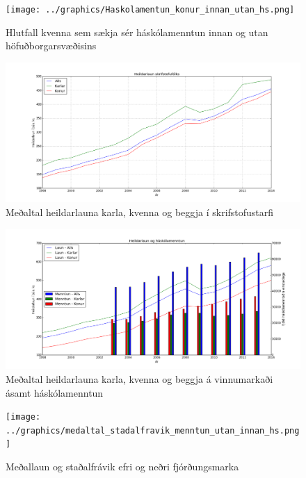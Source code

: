 \documentclass[12pt, git, draft]{rureport}
\begin{document}
\begin{figure}
	\centering 
	\texttt{[image: ../graphics/Haskolamentun\_konur\_innan\_utan\_hs.png]}
	\caption{Hlutfall kvenna sem sækja sér háskólamenntun innan og utan höfuðborgarsvæðisins\label{fig:menntunkonur}}
\end{figure}

\begin{figure}
	\centering 
	\includegraphics[width=\textwidth]{graphics/heildar_laun.png}
	\caption{Meðaltal heildarlauna karla, kvenna og beggja í skrifstofustarfi \label{fig:heildarlaun}}
\end{figure}

\begin{figure}
	\centering 
	\includegraphics[width=\textwidth]{graphics/heildar_laun_og_haskolamentun.png}
	\caption{Meðaltal heildarlauna karla, kvenna og beggja á vinnumarkaði ásamt háskólamenntun \label{fig:heildarhask}}
\end{figure}

\begin{figure}
	\centering 
	\texttt{[image: ../graphics/medaltal\_stadalfravik\_menntun\_utan\_innan\_hs.png]}
	\caption{Meðallaun og staðalfrávik efri og neðri fjórðungsmarka \label{fig:stdhs}}
\end{figure}
\end{document}
